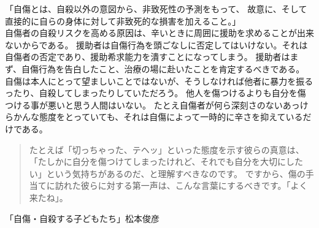 \documentclass[autodetect-engine,dvipdfmx-if-dvi,a5paper,ja=standard,twoside,titlepage,final,twocolumn]{ltjtbook}
\begin{document}
「自傷とは、自殺以外の意図から、非致死性の予測をもって、
故意に、そして直接的に自らの身体に対して非致死的な損害を加えること。」\\

自傷者の自殺リスクを高める原因は、辛いときに周囲に援助を求めることが出来ないからである。
援助者は自傷行為を頭ごなしに否定してはいけない。それは自傷者の否定であり、援助希求能力を潰すことになってしまう。
援助者はまず、自傷行為を告白したこと、治療の場に赴いたことを肯定するべきである。
自傷は本人にとって望ましいことではないが、そうしなければ他者に暴力を振るったり、自殺してしまったりしていただろう。
他人を傷つけるよりも自分を傷つける事が悪いと思う人間はいない。
たとえ自傷者が何ら深刻さのないあっけらかんな態度をとっていても、それは自傷によって一時的に辛さを抑えているだけである。
\begin{quote}
たとえば「切っちゃった、テヘッ」といった態度を示す彼らの真意は、「たしかに自分を傷つけてしまったけれど、それでも自分を大切にしたい」という気持ちがあるのだ、と理解すべきなのです。
ですから、傷の手当てに訪れた彼らに対する第一声は、こんな言葉にするべきです。「よく来たね」。
\end{quote}
「自傷・自殺する子どもたち」松本俊彦


	  
\end{document}
